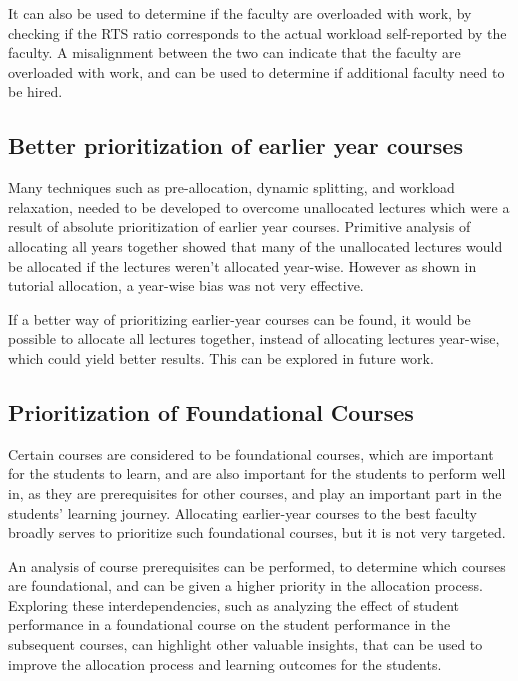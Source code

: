 It can also be used to determine if the faculty are overloaded with work, by checking if the RTS ratio corresponds to the actual workload self-reported by the faculty. A misalignment between the two can indicate that the faculty are overloaded with work, and can be used to determine if additional faculty need to be hired.

\subsection{Better prioritization of earlier year courses}

Many techniques such as pre-allocation, dynamic splitting, and workload relaxation, needed to be developed to overcome unallocated lectures which were a result of absolute prioritization of earlier year courses. Primitive analysis of allocating all years together showed that many of the unallocated lectures would be allocated if the lectures weren't allocated year-wise. However as shown in tutorial allocation, a year-wise bias was not very effective.

If a better way of prioritizing earlier-year courses can be found, it would be possible to allocate all lectures together, instead of allocating lectures year-wise, which could yield better results. This can be explored in future work.

\subsection{Prioritization of Foundational Courses}

Certain courses are considered to be foundational courses, which are important for the students to learn, and are also important for the students to perform well in, as they are prerequisites for other courses, and play an important part in the students' learning journey. Allocating earlier-year courses to the best faculty broadly serves to prioritize such foundational courses, but it is not very targeted.

An analysis of course prerequisites can be performed, to determine which courses are foundational, and can be given a higher priority in the allocation process. Exploring these interdependencies, such as analyzing the effect of student performance in a foundational course on the student performance in the subsequent courses, can highlight other valuable insights, that can be used to improve the allocation process and learning outcomes for the students.

